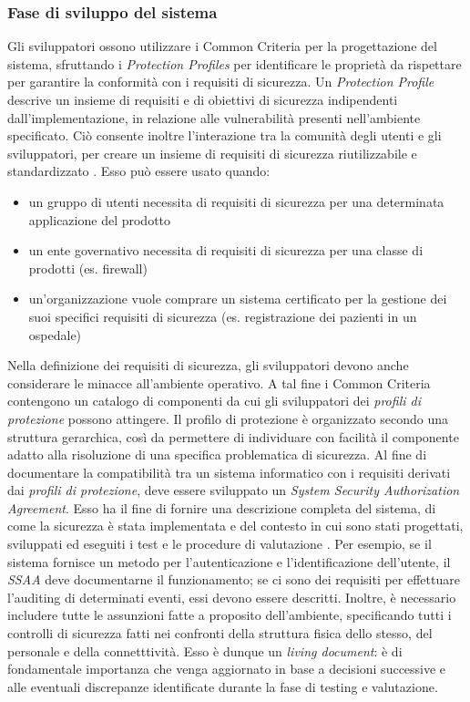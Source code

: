 \documentclass[../main.tex]{subfiles}
\begin{document}
\subsubsection{Fase di sviluppo del sistema}
Gli sviluppatori ossono utilizzare i Common Criteria per la progettazione del sistema, sfruttando i \textit{Protection Profiles} per identificare le proprietà da rispettare per garantire la conformità con i requisiti di sicurezza.
Un \textit{Protection Profile} descrive un insieme di requisiti e di obiettivi di sicurezza indipendenti dall'implementazione, in relazione alle vulnerabilità presenti nell'ambiente specificato. Ciò consente inoltre l'interazione tra la comunità degli utenti e gli sviluppatori, per creare un insieme di requisiti di sicurezza riutilizzabile e standardizzato \cite{CommonCriteriaSans}.
Esso può essere usato quando:
\begin{itemize}
\item un gruppo di utenti necessita di requisiti di sicurezza per una determinata applicazione del prodotto
\item un ente governativo necessita di requisiti di sicurezza per una classe di prodotti (es. firewall)
\item un'organizzazione vuole comprare un sistema certificato per la gestione dei suoi specifici requisiti di sicurezza (es. registrazione dei pazienti in un ospedale)
\end{itemize}
Nella definizione dei requisiti di sicurezza, gli sviluppatori devono anche considerare le minacce all'ambiente operativo. A tal fine i Common Criteria contengono un catalogo di componenti da cui gli sviluppatori dei \textit{profili di protezione} possono attingere. Il profilo di protezione è organizzato secondo una struttura gerarchica, così da permettere di individuare con facilità il componente adatto alla risoluzione di una specifica problematica di sicurezza.
Al fine di documentare la compatibilità tra un sistema informatico con i requisiti derivati dai \textit{profili di protezione}, deve essere sviluppato un \textit{System Security Authorization Agreement}. Esso ha il fine di fornire una descrizione completa del sistema, di come la sicurezza è stata implementata e del contesto in cui sono stati progettati, sviluppati ed eseguiti i test e le procedure di valutazione \cite{CommonCriteriaSans}.
Per esempio, se il sistema fornisce un metodo per l'autenticazione e l'identificazione dell'utente, il \textit{SSAA} deve documentarne il funzionamento; se ci sono dei requisiti per effettuare l'auditing di determinati eventi, essi devono essere descritti.
Inoltre, è necessario includere tutte le assunzioni fatte a proposito dell'ambiente, specificando tutti i controlli di sicurezza fatti nei confronti della struttura fisica dello stesso, del personale e della connetttività.
Esso è dunque un \textit{living document}: è di fondamentale importanza che venga aggiornato in base a decisioni successive e alle eventuali discrepanze identificate durante la fase di testing e valutazione.
\end{document}
